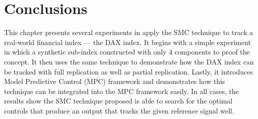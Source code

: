 \section{Conclusions}
\label{sec:conclusion5}
This chapter presents several experiments in apply the SMC technique to track a real-world financial index --- the DAX index.  It begins with a simple experiment in which a synthetic sub-index constructed with only $4$ components to proof the concept. It then uses the same technique to demonstrate how the DAX index can be tracked with full replication as well as partial replication. Lastly, it introduces Model Predictive Control (MPC) framework and demonstrates how this technique can be integrated into the MPC framework easily. In all cases, the results show the SMC technique proposed is able to search for the optimal controls that produce an output that tracks the given reference signal well.

